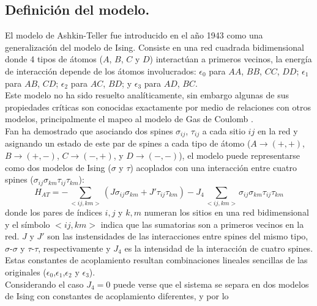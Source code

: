 

\subsection{Definición del modelo.}
\label{sec:AT_model}

El modelo de Ashkin-Teller fue introducido en el año 1943 \cite{ashkin_teller_43} como una generalización del modelo de Ising.
 Consiste en una red cuadrada bidimensional donde 4 tipos de átomos ($A$, $B$, $C$ y $D$) interactúan a primeros vecinos, la energía de
 interacción depende de los átomos involucrados: $\epsilon_{0}$ para $AA$, $BB$, $CC$, $DD$; $\epsilon_{1}$ para $AB$, $CD$;
 $\epsilon_{2}$ para $AC$, $BD$; y $\epsilon_{3}$ para $AD$, $BC$.\\
Este modelo no ha sido resuelto analíticamente, sin embargo algunas de sus propiedades críticas son conocidas exactamente por medio de relaciones con otros modelos, principalmente
 el mapeo al modelo de Gas de Coulomb \cite{cardy_book}.\\
Fan \cite{AT_fan1972b} ha demostrado que asociando dos spines $\sigma_{ij}$, $\tau_{ij}$ a cada sitio $ij$ en la red y asignando un estado de este par de spines
 a cada tipo de átomo ($A\rightarrow (+,+)$, $B\rightarrow (+,-)$, $C\rightarrow (-,+)$, y $D\rightarrow (-,-)$), el modelo
 puede representarse como dos modelos de Ising ($\sigma$ y $\tau$) acoplados con una interacción entre cuatro spines ($\sigma_{ij}\sigma_{km}\tau_{ij}\tau_{km}$):
\\
\begin{equation}
	\label{eq:ham_AT}
	H_{AT}=-\sum_{<ij,km>}(J\sigma_{ij}\sigma_{km}+J'\tau_{ij}\tau_{km})-J_{4}\sum_{<ij,km>}\sigma_{ij}\sigma_{km}\tau_{ij}\tau_{km}
\end{equation}
donde los pares de índices $i,j$ y $k,m$ numeran los sitios en una red bidimensional y el símbolo $<ij,km>$ indica que las sumatorias son a primeros
 vecinos en la red. $J$ y $J'$ son las instensidades de las interacciones entre spines del mismo tipo, $\sigma$-$\sigma$ y $\tau$-$\tau$, respectivamente y
  $J_{4}$ es la intensidad de la interacción de cuatro spines.
 Estas constantes de acoplamiento resultan combinaciones lineales sencillas de las originales ($\epsilon_{0}$,$\epsilon_{1}$,$\epsilon_{2}$ y $\epsilon_{3}$).\\
Considerando el caso $J_{4}=0$ puede verse que el sistema se separa en dos modelos de Ising con constantes de acoplamiento diferentes, y por lo
